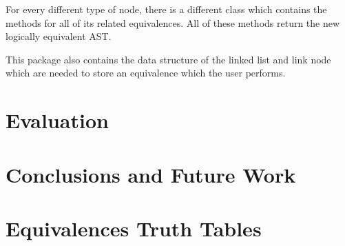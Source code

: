 \documentclass{report}
\begin{document}
For every different type of node, there is a different class which contains
the methods for all of its related equivalences. All of these methods return
the new logically equivalent AST.

This package also contains the data structure of the linked list and link node
which are needed to store an equivalence which the user performs.




\chapter{Evaluation}


\chapter{Conclusions and Future Work}


\begin{thebibliography}{9}
\end{thebibliography}


\appendix
\chapter{Equivalences Truth Tables}
\end{document}
